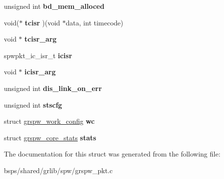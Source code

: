 \begin{DoxyCompactItemize}
\item 
\mbox{\label{structgrspw__priv_a3a9174742293278b08b0a8c95c40b2f5}} 
unsigned int {\bfseries bd\+\_\+mem\+\_\+alloced}
\item 
\mbox{\label{structgrspw__priv_aef3269e6a1abd27c55f1fbbdfe9af380}} 
void($\ast$ {\bfseries tcisr} )(void $\ast$data, int timecode)
\item 
\mbox{\label{structgrspw__priv_a194cf10860b17bf9758ecd54a96d9438}} 
void $\ast$ {\bfseries tcisr\+\_\+arg}
\item 
\mbox{\label{structgrspw__priv_ac7b974e84d6cbf72af0ba881e367094f}} 
spwpkt\+\_\+ic\+\_\+isr\+\_\+t {\bfseries icisr}
\item 
\mbox{\label{structgrspw__priv_a5aead9d964597bd8a69aa2abc651d2a3}} 
void $\ast$ {\bfseries icisr\+\_\+arg}
\item 
\mbox{\label{structgrspw__priv_a034b4d623b336f6e6a41d14f42dd86e4}} 
unsigned int {\bfseries dis\+\_\+link\+\_\+on\+\_\+err}
\item 
\mbox{\label{structgrspw__priv_af18069dc5b3e8bcecb4bfee7b677a43e}} 
unsigned int {\bfseries stscfg}
\item 
\mbox{\label{structgrspw__priv_a3d547cb47ffe0bce6d569bcc5d564afe}} 
struct \mbox{\hyperlink{structgrspw__work__config}{grspw\+\_\+work\+\_\+config}} {\bfseries wc}
\item 
\mbox{\label{structgrspw__priv_a2fe0c3ff8e81f753d50582a4c4412a3e}} 
struct \mbox{\hyperlink{structgrspw__core__stats}{grspw\+\_\+core\+\_\+stats}} {\bfseries stats}
\end{DoxyCompactItemize}


The documentation for this struct was generated from the following file\+:\begin{DoxyCompactItemize}
\item 
bsps/shared/grlib/spw/grspw\+\_\+pkt.\+c\end{DoxyCompactItemize}

